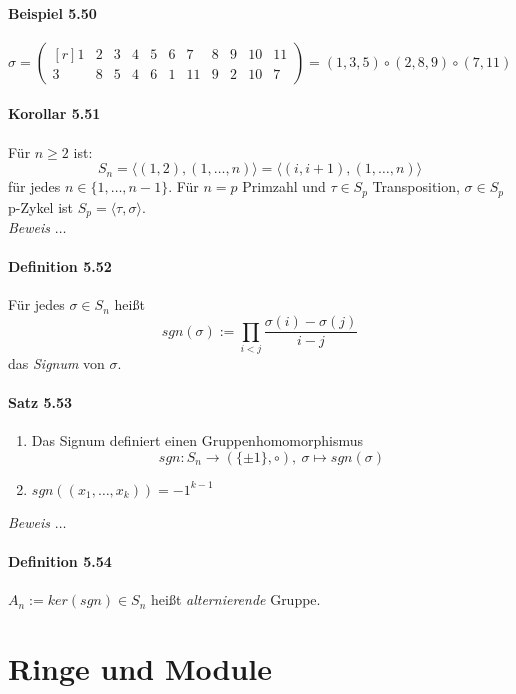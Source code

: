 \documentclass{scrartcl}
\begin{document}
\paragraph{Beispiel 5.50}
\[
  \sigma =
  \begin{pmatrix*}[r]
    1 & 2 & 3 & 4 & 5 & 6 & 7 & 8 & 9 & 10 & 11 \\
    3 & 8 & 5 & 4 & 6 & 1 & 11 & 9 & 2 & 10 & 7
  \end{pmatrix*}
  = (1, 3, 5) \circ (2, 8, 9) \circ (7, 11)
\]

\paragraph{Korollar 5.51}
Für $ n \geq 2$ ist:
\[
  S_n = \langle {(1, 2), (1, \dots, n)} \rangle = \langle {(i, i+1), (1, \dots,
    n)} \rangle
\]
für jedes $n \in \{1, \dots, n - 1\}$. Für $n = p$ Primzahl und $\tau \in S_p$
Transposition, $\sigma \in S_p$ p-Zykel ist $S_p = \langle {\tau, \sigma}
\rangle$. \\
\textit{Beweis} $\dots$

\paragraph{Definition 5.52}
Für jedes $\sigma \in S_n$ heißt
\[
  sgn(\sigma) := \prod_{i < j}\frac{\sigma(i) - \sigma(j)}{i - j}
\]
das \textit{Signum} von $\sigma$.

\paragraph{Satz 5.53}
\begin{enumerate}
\item Das Signum definiert einen Gruppenhomomorphismus
  \[
    sgn: S_n \to (\{\pm 1\}, \circ),~\sigma \mapsto sgn(\sigma)
  \]
\item $sgn((x_1, \dots, x_k)) = -1^{k-1}$
\end{enumerate}
\textit{Beweis} $\dots$

\paragraph{Definition 5.54}
$A_n := ker(sgn) \in S_n$ heißt \textit{alternierende} Gruppe.

\section{Ringe und Module}
\label{sec:ringeundmodule}
\end{document}

